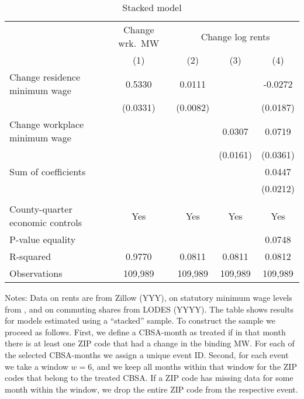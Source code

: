 \begin{table}[hbt!] \centering
	\caption{Stacked model}
	\label{tab:stacked_w6}
	\begin{tabular}{l*{4}{c}}
		\toprule
		& \multicolumn{1}{c}{Change wrk.\ MW}
		& \multicolumn{3}{c}{Change log rents}                            \\ \cmidrule(lr){2-2}\cmidrule(lr){3-5}
		                                   & (1)   & (2)   & (3)   & (4)      \\ \midrule
		Change residence minimum wage      &  0.5330  &  0.0111  &       &  -0.0272     \\
		                                   & (0.0331) & (0.0082) &       & (0.0187)    \\
		Change workplace minimum wage      &       &       &  0.0307  & 0.0719      \\
		                                   &       &       & (0.0161) & (0.0361)    \\ \midrule
		Sum of coefficients                &       &       &       &  0.0447     \\
		                                   &       &       &       & (0.0212)    \\
		                                   &       &       &       &          \\ \midrule
		County-quarter economic controls   &  Yes  & Yes   & Yes   & Yes      \\
		P-value equality                   &       &       &       & 0.0748      \\
		R-squared                          &  0.9770  &  0.0811  &  0.0811  & 0.0812      \\
		Observations                       & 109,989  & 109,989  & 109,989  & 109,989     \\\bottomrule
	\end{tabular}
    
    \begin{minipage}{.95\textwidth} \footnotesize
        \vspace{2mm}
        Notes: Data on rents are from Zillow (YYY), on statutory minimum wage levels
        from \textcite{VaghulZipperer2016, BerkeleyLaborCenter}, and on commuting 
        shares from LODES (YYYY).
        The table shows results for models estimated using a ``stacked'' sample.
        To construct the sample we proceed as follows.
        First, we define a CBSA-month as treated if in that month there is at least one ZIP 
        code that had a change in the binding MW.
        For each of the selected CBSA-months we assign a unique event ID. 
        Second, for each event we take a window $w = 6$, and we keep all months within that 
        window for the ZIP codes that belong to the treated CBSA.
        If a ZIP code has missing data for some month within the window, we drop the entire 
        ZIP code from the respective event. 
    \end{minipage}
\end{table}
